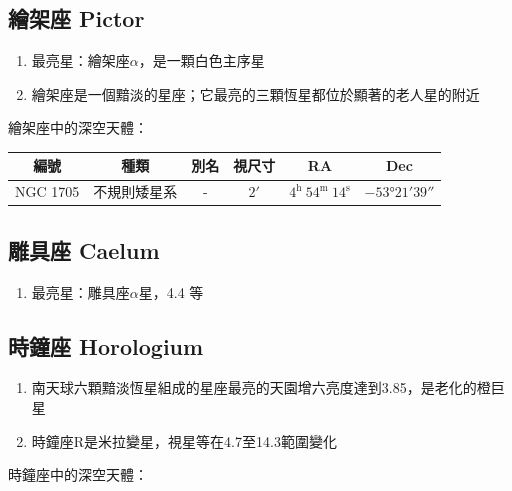 \subsection{繪架座 Pictor}
\begin{enumerate}
    \item 最亮星：繪架座\(\alpha\)，是一顆白色主序星
    \item 繪架座是一個黯淡的星座；它最亮的三顆恆星都位於顯著的老人星的附近
\end{enumerate}
繪架座中的深空天體：
\begin{center}
\begin{longtable}{c | c | c | c | c | c}
    編號 & 種類 & 別名 & 視尺寸 & RA & Dec \\
    \hline
    \endfirsthead


    \endfoot

    \endlastfoot

    NGC 1705 & 不規則矮星系 & - & \(\ang{;2;}\) & \(4^\text{h }54^\text{m }14^\text{s}\) & \(-\ang{53;21;39}\) \\
\end{longtable}
\end{center}

\subsection{雕具座 Caelum}
\begin{enumerate}
    \item 最亮星：雕具座\(\alpha\)星，4.4 等
\end{enumerate}

\subsection{時鐘座 Horologium}
\begin{enumerate}
    \item 南天球六顆黯淡恆星組成的星座最亮的天園增六亮度達到3.85，是老化的橙巨星
    \item 時鐘座R是米拉變星，視星等在4.7至14.3範圍變化
\end{enumerate}
時鐘座中的深空天體：


